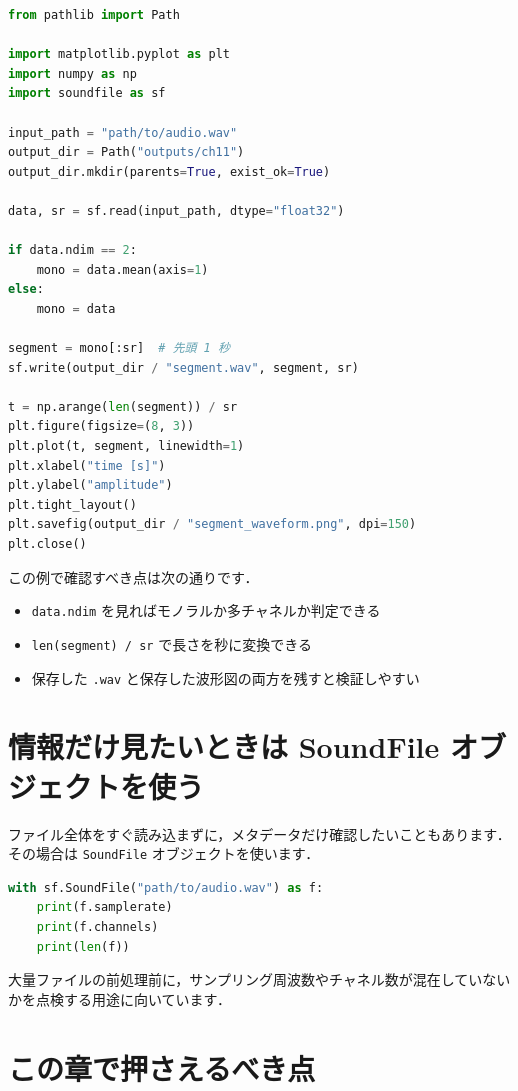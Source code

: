 \begin{lstlisting}[style=codecell,language=Python]
from pathlib import Path

import matplotlib.pyplot as plt
import numpy as np
import soundfile as sf

input_path = "path/to/audio.wav"
output_dir = Path("outputs/ch11")
output_dir.mkdir(parents=True, exist_ok=True)

data, sr = sf.read(input_path, dtype="float32")

if data.ndim == 2:
    mono = data.mean(axis=1)
else:
    mono = data

segment = mono[:sr]  # 先頭 1 秒
sf.write(output_dir / "segment.wav", segment, sr)

t = np.arange(len(segment)) / sr
plt.figure(figsize=(8, 3))
plt.plot(t, segment, linewidth=1)
plt.xlabel("time [s]")
plt.ylabel("amplitude")
plt.tight_layout()
plt.savefig(output_dir / "segment_waveform.png", dpi=150)
plt.close()
\end{lstlisting}

この例で確認すべき点は次の通りです．
\begin{itemize}
\item \texttt{data.ndim} を見ればモノラルか多チャネルか判定できる
\item \texttt{len(segment) / sr} で長さを秒に変換できる
\item 保存した \texttt{.wav} と保存した波形図の両方を残すと検証しやすい
\end{itemize}


\section{情報だけ見たいときは SoundFile オブジェクトを使う}

ファイル全体をすぐ読み込まずに，メタデータだけ確認したいこともあります．
その場合は \texttt{SoundFile} オブジェクトを使います．

\begin{lstlisting}[style=codecell,language=Python]
with sf.SoundFile("path/to/audio.wav") as f:
    print(f.samplerate)
    print(f.channels)
    print(len(f))
\end{lstlisting}

大量ファイルの前処理前に，サンプリング周波数やチャネル数が混在していないかを点検する用途に向いています．


\section{この章で押さえるべき点}

